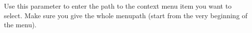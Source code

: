 
Use this parameter to enter the path to the context menu item you want to select. Make sure you give the whole menupath (start from the very beginning of the menu).


